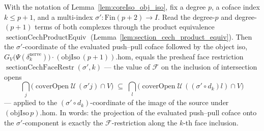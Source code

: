 \begin{lemma}
  \label{lem:coreIso_comm_leg}
  With the notation of Lemma~\ref{lem:coreIso_obj_iso}, fix a degree \(p\), a coface index
  \(k \le p+1\), and a multi-index \(\sigma' : \mathrm{Fin}(p+2) \to I\). Read the degree-\(p\)
  and degree-\((p+1)\) terms of both complexes through the product equivalence
  \(\operatorname{sectionCechProductEquiv}\) (Lemma~\ref{lem:section_cech_product_equiv}). Then
  the \(\sigma'\)-coordinate of the evaluated push--pull coface followed by the object iso,
  \(G_V\bigl(\Psi(\delta^{\mathrm{nerve}}_k)\bigr) \cdot (\mathrm{objIso}\,(p+1)).\mathrm{hom}\),
  equals the presheaf face restriction \(\operatorname{sectionCechFaceRestr}(\sigma', k)\) — the
  value of \(\mathcal{F}\) on the inclusion of intersection opens
  \[
    \bigcap_{j}\bigl(\operatorname{coverOpen}\mathcal{U}\,(\sigma' j) \cap V\bigr)
      \;\subseteq\;
    \bigcap_{l}\bigl(\operatorname{coverOpen}\mathcal{U}\,((\sigma' \circ d_k) l) \cap V\bigr)
  \]
  — applied to the \((\sigma' \circ d_k)\)-coordinate of the image of the source under
  \((\mathrm{objIso}\,p).\mathrm{hom}\). In words: the projection of the evaluated push--pull
  coface onto the \(\sigma'\)-component is exactly the \(\mathcal{F}\)-restriction along the
  \(k\)-th face inclusion.
\end{lemma}
